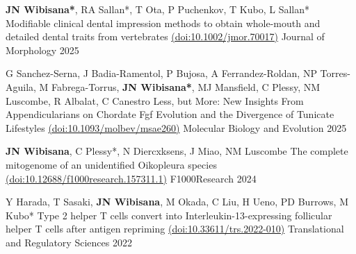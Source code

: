 

\begin{cventries}

  \cventrypub
    {\textbf{JN Wibisana*}, RA Sallan*, T Ota, P Puchenkov, T Kubo, L Sallan*} %
    {Modifiable clinical dental impression methods to obtain whole-mouth and detailed dental traits from vertebrates \href{https://doi.org/10.1002/jmor.70017}{(doi:10.1002/jmor.70017)}} %
    {Journal of Morphology} %
    {2025} %

  \cventrypub
    {G Sanchez-Serna, J Badia-Ramentol, P Bujosa, A Ferrandez-Roldan, NP Torres-Aguila, M Fabrega-Torrus, \textbf{JN Wibisana*}, MJ Mansfield, C Plessy, NM Luscombe, R Albalat, C Canestro} %
    {Less, but More: New Insights From Appendicularians on Chordate Fgf Evolution and the Divergence of Tunicate Lifestyles \href{https://doi.org/10.1093/molbev/msae260}{(doi:10.1093/molbev/msae260)}} %
    {Molecular Biology and Evolution} %
    {2025} %

  \cventrypub
    {\textbf{JN Wibisana}, C Plessy*, N Diercxksens, J Miao, NM Luscombe} %
    {The complete mitogenome of an unidentified Oikopleura species \href{https://doi.org/10.12688/f1000research.157311.1}{(doi:10.12688/f1000research.157311.1)}} %
    {F1000Research} %
    {2024} %

  \cventrypub
    {Y Harada, T Sasaki, \textbf{JN Wibisana}, M Okada, C Liu, H Ueno, PD Burrows, M Kubo*} %
    {Type 2 helper T cells convert into Interleukin-13-expressing follicular helper T cells after antigen repriming \href{https://doi.org/10.33611/trs.2022-010}{(doi:10.33611/trs.2022-010)}} %
    {Translational and Regulatory Sciences} %
    {2022} %


\end{cventries}
